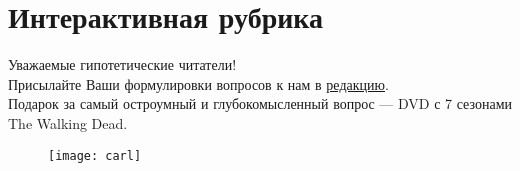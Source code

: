 \section{Интерактивная рубрика}
\subtitle{Задай вопрос Карлу}
Уважаемые гипотетические читатели!\\
Присылайте Ваши формулировки вопросов к нам в \href{https://vk.com/id12023cool}{редакцию}.\\
Подарок за самый остроумный и глубокомысленный вопрос --- DVD с 7 сезонами The Walking Dead.

\begin{figure}[ht!]
    \centering
    \texttt{[image: carl]}
\end{figure}
